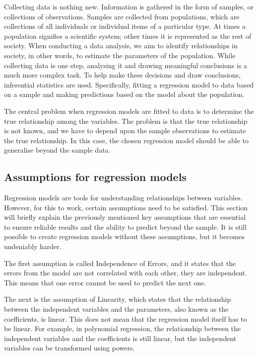 Collecting data is nothing new. Information is gathered in the form of samples, or collections of observations. Samples are collected from populations, which are collections of all individuals or individual items of a particular type. At times a population signifies a scientific system; other times it is represented as the rest of society. When conducting a data analysis, we aim to identify relationships in society, in other words, to estimate the parameters of the population. While collecting data is one step, analysing it and drawing meaningful conclusions is a much more complex task. To help make these decisions and draw conclusions, inferential statistics are used. Specifically, fitting a regression model to data based on a sample and making predictions based on the model about the population. \newline

\noindent The central problem when regression models are fitted to data is to determine the true relationship among the variables. The problem is that the true relationship is not known, and we have to depend upon the sample observations to estimate the true relationship. In this case, the chosen regression model should be able to generalise beyond the sample data. \newline 



\subsection{Assumptions for regression models}

\noindent Regression models are tools for understanding relationships between variables. However, for this to work, certain assumptions need to be satisfied. This section will briefly explain the previously mentioned key assumptions that are essential to ensure reliable results and the ability to predict beyond the sample. It is still possible to create regression models without these assumptions, but it becomes undeniably harder.  \newline

\noindent The first assumption is called Independence of Errors, and it states that the errors from the model are not correlated with each other, they are independent. This means that one error cannot be used to predict the next one. \newline


\noindent The next is the assumption of Linearity, which states that the relationship between the independent variables and the parameters, also known as the coefficients, is linear. This does not mean that the regression model itself has to be linear. For example, in polynomial regression, the relationship between the independent variables and the coefficients is still linear, but the independent variables can be transformed using powers.\newline


